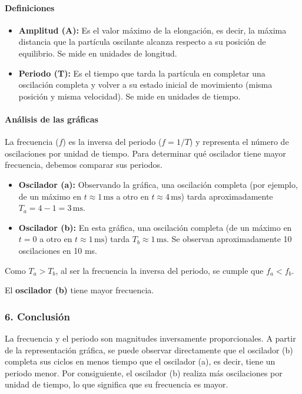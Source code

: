 \paragraph{Definiciones}
\begin{itemize}
    \item \textbf{Amplitud (A):} Es el valor máximo de la elongación, es decir, la máxima distancia que la partícula oscilante alcanza respecto a su posición de equilibrio. Se mide en unidades de longitud.
    \item \textbf{Periodo (T):} Es el tiempo que tarda la partícula en completar una oscilación completa y volver a su estado inicial de movimiento (misma posición y misma velocidad). Se mide en unidades de tiempo.
\end{itemize}

\paragraph{Análisis de las gráficas}
La frecuencia ($f$) es la inversa del periodo ($f=1/T$) y representa el número de oscilaciones por unidad de tiempo. Para determinar qué oscilador tiene mayor frecuencia, debemos comparar sus periodos.

\begin{itemize}
    \item \textbf{Oscilador (a):} Observando la gráfica, una oscilación completa (por ejemplo, de un máximo en $t \approx 1\,\text{ms}$ a otro en $t \approx 4\,\text{ms}$) tarda aproximadamente $T_a = 4-1 = 3\,\text{ms}$.
    \item \textbf{Oscilador (b):} En esta gráfica, una oscilación completa (de un máximo en $t=0$ a otro en $t \approx 1\,\text{ms}$) tarda $T_b \approx 1\,\text{ms}$. Se observan aproximadamente 10 oscilaciones en 10 ms.
\end{itemize}

Como $T_a > T_b$, al ser la frecuencia la inversa del periodo, se cumple que $f_a < f_b$.

\begin{cajaresultado}
El \textbf{oscilador (b)} tiene mayor frecuencia.
\end{cajaresultado}

\subsubsection*{6. Conclusión}
\begin{cajaconclusion}
La frecuencia y el periodo son magnitudes inversamente proporcionales. A partir de la representación gráfica, se puede observar directamente que el oscilador (b) completa sus ciclos en menos tiempo que el oscilador (a), es decir, tiene un periodo menor. Por consiguiente, el oscilador (b) realiza más oscilaciones por unidad de tiempo, lo que significa que su frecuencia es mayor.
\end{cajaconclusion}

